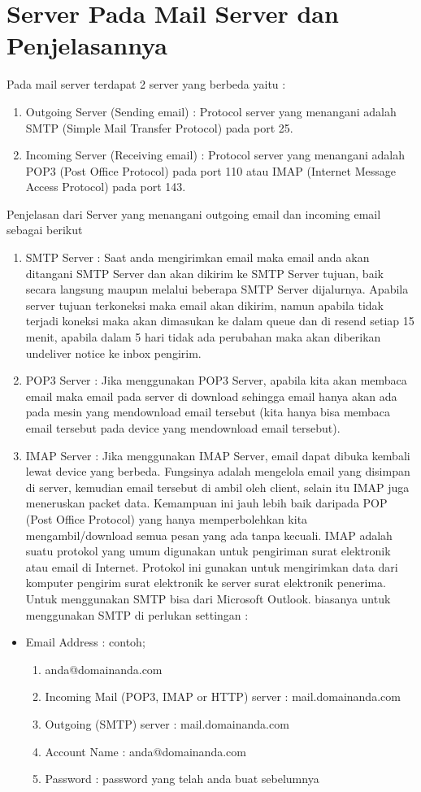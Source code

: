 \section {Server Pada Mail Server dan Penjelasannya} 
Pada mail server terdapat 2 server yang berbeda yaitu :  
\begin{enumerate}
\item Outgoing Server (Sending email) : Protocol server yang menangani adalah SMTP (Simple Mail Transfer Protocol) pada port 25. 
\item Incoming Server (Receiving email) : Protocol server yang menangani adalah POP3 (Post Office Protocol) pada port 110 atau IMAP (Internet Message Access Protocol) pada port 143.
 \end{enumerate}
Penjelasan dari Server yang menangani outgoing email dan incoming email sebagai berikut 
\begin{enumerate}
\item SMTP Server : Saat anda mengirimkan email maka email anda akan ditangani SMTP Server dan akan dikirim ke SMTP Server tujuan, baik secara langsung maupun melalui beberapa SMTP Server dijalurnya. Apabila server tujuan terkoneksi maka email akan dikirim, namun apabila tidak terjadi koneksi maka akan dimasukan ke dalam queue dan di resend setiap 15 menit, apabila dalam 5 hari tidak ada perubahan maka akan diberikan undeliver notice ke inbox pengirim. 
\item POP3 Server : Jika menggunakan POP3 Server, apabila kita akan membaca email maka email pada server di download sehingga email hanya akan ada pada mesin yang mendownload email tersebut (kita hanya bisa membaca email tersebut pada device yang mendownload email tersebut). 
\item IMAP Server : Jika menggunakan IMAP Server, email dapat dibuka kembali lewat device yang berbeda. Fungsinya adalah mengelola email yang disimpan di server, kemudian email tersebut di ambil oleh client, selain itu IMAP juga meneruskan packet data. Kemampuan ini jauh lebih baik daripada POP (Post Office Protocol) yang hanya memperbolehkan kita mengambil/download semua pesan yang ada tanpa kecuali. IMAP adalah suatu  protokol yang umum digunakan untuk pengiriman surat elektronik atau email di Internet. Protokol ini gunakan untuk mengirimkan data dari komputer pengirim surat elektronik ke server surat elektronik penerima. Untuk menggunakan SMTP bisa dari Microsoft Outlook. biasanya untuk menggunakan SMTP di perlukan settingan :
\end{enumerate} 
\begin{itemize}
\item Email Address : contoh; 
\begin{enumerate}
\item anda@domainanda.com 
\item Incoming Mail (POP3, IMAP or HTTP) server : mail.domainanda.com 
\item Outgoing (SMTP) server : mail.domainanda.com 
\item Account Name : anda@domainanda.com 
\item Password : password yang telah anda buat sebelumnya
\end{enumerate} 
\end{itemize}
